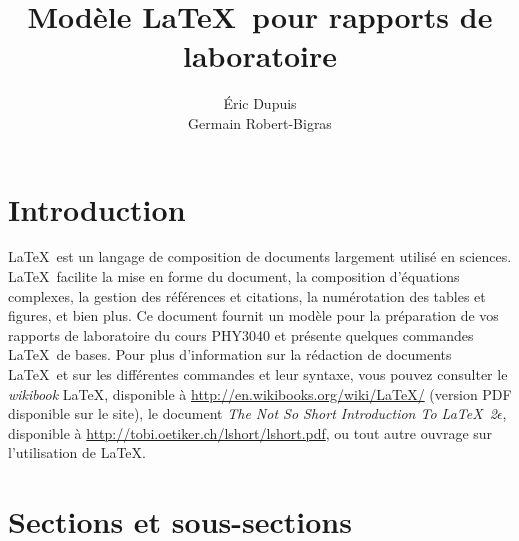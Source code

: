 \documentclass[10pt,letterpaper,twocolumn]{article}
\title{\vspace{-10mm}\Large
Modèle \LaTeX\ pour rapports de laboratoire %
\vspace{-4mm}}
\author{\large
Éric Dupuis\\
Germain Robert-Bigras %
}
\date{\vspace{-8mm}}
\begin{document}

\section{Introduction}\label{intro}

\LaTeX\ est un langage de composition de documents largement utilisé en sciences. \LaTeX\ facilite la mise en forme du document, la composition d'équations complexes, la gestion des références et citations, la numérotation des tables et figures, et bien plus. Ce document fournit un modèle pour la préparation de vos rapports de laboratoire du cours PHY3040 et présente quelques commandes \LaTeX\ de bases. Pour plus d'information sur la rédaction de documents \LaTeX\ et sur les différentes commandes et leur syntaxe, vous pouvez consulter le {\em wikibook} \LaTeX, disponible à \url{http://en.wikibooks.org/wiki/LaTeX/} (version PDF disponible sur le site), le document {\em The Not So Short Introduction To \LaTeX\ 2$\epsilon$}, disponible à \url{http://tobi.oetiker.ch/lshort/lshort.pdf}, ou tout autre ouvrage sur l'utilisation de \LaTeX.

\section{Sections et sous-sections}
\end{document}
